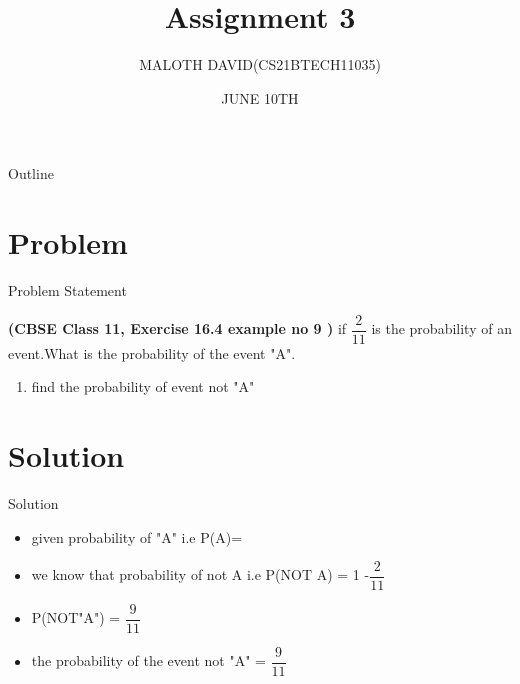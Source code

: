 \documentclass{beamer}
\title{Assignment 3}
\author{MALOTH DAVID(CS21BTECH11035)}
\date{JUNE 10TH}
\begin{document}
\begin{frame}
    \titlepage 
\end{frame}

\begin{frame}{Outline}
    \tableofcontents
\end{frame}


\section{Problem}
\begin{frame}{Problem Statement}

\textbf{(CBSE Class 11, Exercise 16.4 example no 9 )} if      $\dfrac{2}{11}$ is the probability of an event.What is the probability of the event "A".
\begin{enumerate}[label=(\alph{enumerate})]
    \item find the probability of event not "A"
\end{enumerate}
\end{frame}


\section{Solution}
\begin{frame}{Solution}

\begin{itemize}

\item given probability of "A" i.e P(A)=

\item we know that probability of not A i.e
 P(NOT A) = 1 -$\dfrac{2}{11}$
 
\item P(NOT"A") = $\dfrac{9}{11}$
 \item the probability of the event not "A" = $\dfrac{9}{11}$
\end{itemize}
    
       
    
        
\end{frame} 
\end{document}
